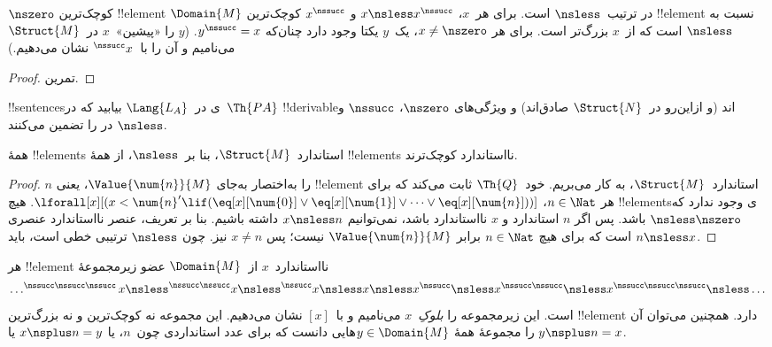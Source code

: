 \documentclass[../../../include/open-logic-section]{subfiles}
\begin{document}
\begin{prop}
 $\nszero$ کوچک‌ترین !!{element}
$\Domain{M}$ در ترتیب~$\nsless$ است. برای هر~$x$،
$x \nsless x^\nssucc$ و $x^\nssucc$ کوچک‌ترین !!{element} نسبت به
$\nsless$ است که از~$x$ بزرگ‌تر است. برای هر
$x \neq \nszero$، یک~$y$ یکتا وجود دارد چنان‌که
$y^\nssucc = x$. ($y$ را «پیشین»~$x$ در~$\Struct{M}$ می‌نامیم و آن
را با~$^\nssucc x$ نشان می‌دهیم.)
\end{prop}

\begin{proof}
تمرین.
\end{proof}

\begin{prob}
!!{sentence}sی در~$\Lang{L_A}$ بیابید که در~$\Th{PA}$
!!{derivable}اند (و ازاین‌رو در~$\Struct{N}$ صادق‌اند) و ویژگی‌های
$\nszero$، $\nssucc$ و $\nsless$ در
 را تضمین می‌کنند.
\end{prob}

\begin{prop}
همهٔ !!{element}s استاندارد~$\Struct{M}$، بنا بر~$\nsless$، از همهٔ
!!{element}s نااستاندارد کوچک‌ترند.
\end{prop}

\begin{proof}
$n$ را به‌اختصار به‌جای $\Value{\num{n}}{M}$، یعنی !!{element}
استاندارد~$\Struct{M}$، به کار می‌بریم. خود~$\Th{Q}$ ثابت می‌کند که
برای هر $n \in \Nat$،
$\lforall[x][(x < \num{n}' \lif (\eq[x][\num{0}] \lor
  \eq[x][\num{1}] \lor \dots \lor \eq[x][\num{n}]))]$. هیچ
!!{element}sی وجود ندارد که $\nsless \nszero$ باشد. پس اگر $n$
استاندارد و $x$ نااستاندارد باشد، نمی‌توانیم $x \nsless n$ داشته
باشیم. بنا بر تعریف، عنصر نااستاندارد عنصری است که برای هیچ
$n \in \Nat$ برابر $\Value{\num{n}}{M}$ نیست؛ پس $x \neq n$ نیز.
چون $\nsless$ ترتیبی خطی است، باید $n \nsless x$.
\end{proof}

\begin{prop}
هر !!{element} نااستاندارد~$x$ از~$\Domain{M}$ عضو زیرمجموعهٔ
\[
\dots ^{\nssucc\nssucc\nssucc}x \nsless ^{\nssucc\nssucc}x \nsless
^{\nssucc}x \nsless x \nsless x^{\nssucc} \nsless x^{\nssucc\nssucc}
\nsless x^{\nssucc\nssucc\nssucc} \nsless \dots
\]
است. این زیرمجموعه را
\emph{بلوکِ~$x$} می‌نامیم و با~$[x]$ نشان می‌دهیم. این مجموعه نه
کوچک‌ترین و نه بزرگ‌ترین !!{element} دارد. همچنین می‌توان آن را
مجموعهٔ همهٔ $y \in \Domain{M}$هایی دانست که برای عدد استانداردی
چون~$n$، یا $x \nsplus n = y$ یا $y \nsplus n = x$.
\end{prop}
\end{document}
